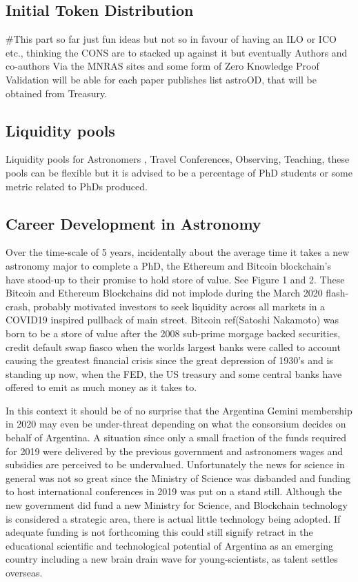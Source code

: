 \documentclass[final,5p,times,twocolumn,authoryear]{elsarticle}
\begin{document}
\subsection{Initial Token Distribution}
#This part so far just fun ideas but not so in favour of having an ILO or ICO etc., thinking the CONS are to stacked up against it but eventually 
Authors and co-authors Via the MNRAS sites and some form of Zero Knowledge Proof Validation will be able for each paper publishes list astroOD, that will be obtained from Treasury.

\subsection{Liquidity pools}

Liquidity pools for Astronomers , Travel Conferences, Observing, Teaching, these pools can be flexible but it is advised to be a percentage of PhD  students or some metric related to PhDs produced. 

\subsection{Career Development in Astronomy}

Over the time-scale of 5 years, incidentally about the average time it takes a new astronomy major to complete a PhD, the Ethereum and Bitcoin blockchain's have stood-up to their promise to hold store of value. See Figure 1 and 2. These Bitcoin and Ethereum Blockchains did not implode during the March 2020 flash-crash, probably motivated investors to seek liquidity across all markets in a COVID19 inspired pullback of main street.  Bitcoin ref(Satoshi Nakamoto) was born to be a store of value after the 2008 sub-prime morgage backed securities, credit default swap fiasco when the worlds largest banks were called to account causing the greatest financial crisis since the great depression of 1930's and is standing up now, when the FED, the US treasury and some central banks have offered to emit as much money as it takes to.
 
In this context it should be of no surprise that the Argentina Gemini membership in 2020 may even be under-threat depending on what the consorsium decides on behalf of Argentina. A situation since only a small fraction of the funds required for 2019 were delivered by the previous government and astronomers wages and subsidies are perceived to be undervalued. Unfortunately the news for science in general was not so great since the Ministry of Science was disbanded and funding to host international conferences in 2019 was put on a stand still. Although the new government did fund a new Ministry for Science, and Blockchain technology is considered a strategic area, there is actual little technology being adopted. If adequate funding is not forthcoming this could still signify retract in the educational scientific and technological potential of Argentina as an emerging country including a new brain drain wave for young-scientists, as talent settles overseas. 
\end{document}
